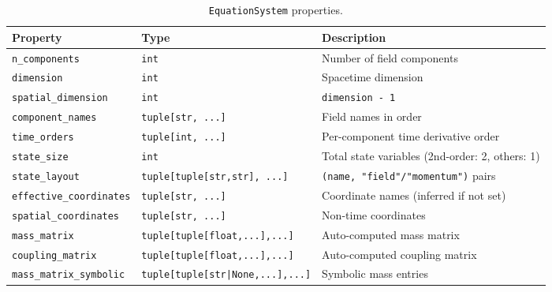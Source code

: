 \begin{table}[htbp]
\centering
\caption{\texttt{EquationSystem} properties.}
\label{tab:json-equation-system}
\begin{tabular}{@{}lll@{}}
\toprule
Property & Type & Description \\
\midrule
\texttt{n\_components}          & \texttt{int}                          & Number of field components \\
\texttt{dimension}             & \texttt{int}                          & Spacetime dimension \\
\texttt{spatial\_dimension}     & \texttt{int}                          & \texttt{dimension - 1} \\
\texttt{component\_names}       & \texttt{tuple[str, ...]}              & Field names in order \\
\texttt{time\_orders}           & \texttt{tuple[int, ...]}              & Per-component time derivative order \\
\texttt{state\_size}            & \texttt{int}                          & Total state variables (2nd-order: 2, others: 1) \\
\texttt{state\_layout}          & \texttt{tuple[tuple[str,str], ...]}   & \texttt{(name, "field"/"momentum")} pairs \\
\texttt{effective\_coordinates} & \texttt{tuple[str, ...]}              & Coordinate names (inferred if not set) \\
\texttt{spatial\_coordinates}   & \texttt{tuple[str, ...]}              & Non-time coordinates \\
\texttt{mass\_matrix}           & \texttt{tuple[tuple[float,...],...]}   & Auto-computed mass matrix \\
\texttt{coupling\_matrix}       & \texttt{tuple[tuple[float,...],...]}   & Auto-computed coupling matrix \\
\texttt{mass\_matrix\_symbolic}  & \texttt{tuple[tuple[str|None,...],...]}&Symbolic mass entries \\
\bottomrule
\end{tabular}
\end{table}
